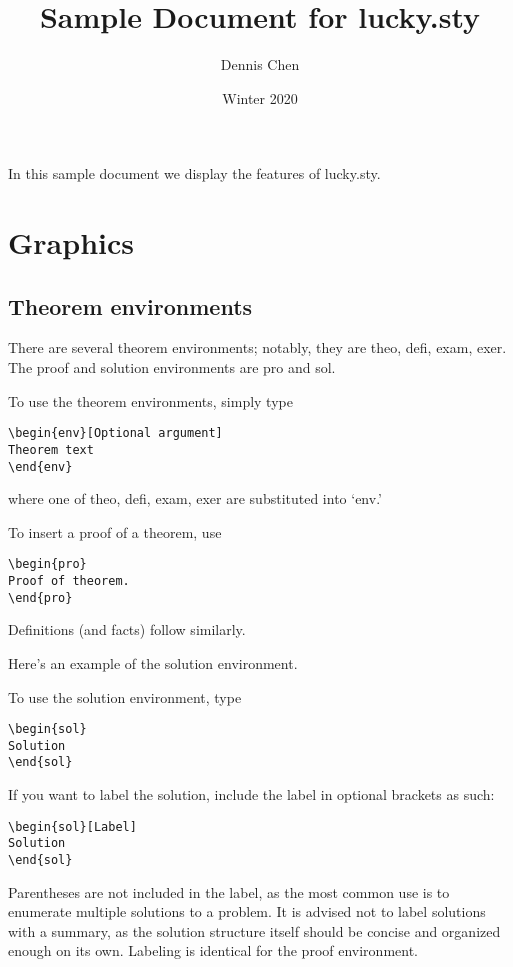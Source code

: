 \documentclass{lucky}
\title{Sample Document for lucky.sty}
\author{Dennis Chen}
\date{Winter 2020}
\begin{document}
\maketitle

In this sample document we display the features of lucky.sty.

\section{Graphics}

\subsection{Theorem environments}

There are several theorem environments; notably, they are theo, defi, exam, exer. The proof and solution environments are pro and sol.

\begin{theo}
To use the theorem environments, simply type
\begin{verbatim}
\begin{env}[Optional argument]
Theorem text
\end{env}
\end{verbatim}
where one of theo, defi, exam, exer are substituted into `env.'
\end{theo}

\begin{pro}
To insert a proof of a theorem, use
\begin{verbatim}
\begin{pro}
Proof of theorem.
\end{pro}
\end{verbatim}
\end{pro}

\begin{defi}[Definitions]
Definitions (and facts) follow similarly.
\end{defi}

\begin{exam}
Here's an example of the solution environment.
\end{exam}

\begin{sol}
To use the solution environment, type
\begin{verbatim}
\begin{sol}
Solution
\end{sol}
\end{verbatim}
If you want to label the solution, include the label in optional brackets as such:
\begin{verbatim}
\begin{sol}[Label]
Solution
\end{sol}
\end{verbatim}
Parentheses are not included in the label, as the most common use is to enumerate multiple solutions to a problem. It is advised not to label solutions with a summary, as the solution structure itself should be concise and organized enough on its own. Labeling is identical for the proof environment.
\end{sol}
\end{document}
